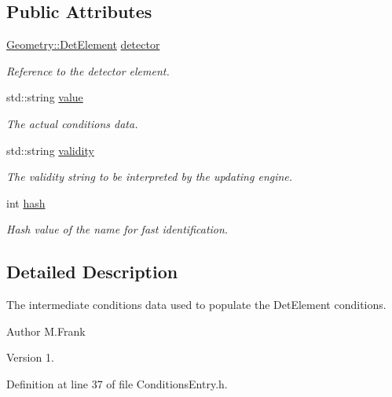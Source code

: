 \subsection*{Public Attributes}
\begin{DoxyCompactItemize}
\item 
\hyperlink{class_d_d4hep_1_1_geometry_1_1_det_element}{Geometry\+::\+Det\+Element} \hyperlink{class_d_d4hep_1_1_conditions_1_1_entry_ae10613b25e5bc54df7d4ada0a2b774a9}{detector}
\begin{DoxyCompactList}\small\item\em Reference to the detector element. \end{DoxyCompactList}\item 
std\+::string \hyperlink{class_d_d4hep_1_1_conditions_1_1_entry_a28dbb34f86ab05df22df9f9756100bcf}{value}
\begin{DoxyCompactList}\small\item\em The actual conditions data. \end{DoxyCompactList}\item 
std\+::string \hyperlink{class_d_d4hep_1_1_conditions_1_1_entry_a9a559618af3b8d15be51c806e40d1764}{validity}
\begin{DoxyCompactList}\small\item\em The validity string to be interpreted by the updating engine. \end{DoxyCompactList}\item 
int \hyperlink{class_d_d4hep_1_1_conditions_1_1_entry_a7f213cb001c089b5aa3ed890aa1f05b5}{hash}
\begin{DoxyCompactList}\small\item\em Hash value of the name for fast identification. \end{DoxyCompactList}\end{DoxyCompactItemize}


\subsection{Detailed Description}
The intermediate conditions data used to populate the Det\+Element conditions. 

\begin{DoxyAuthor}{Author}
M.\+Frank 
\end{DoxyAuthor}
\begin{DoxyVersion}{Version}
1. 
\end{DoxyVersion}


Definition at line 37 of file Conditions\+Entry.\+h.




